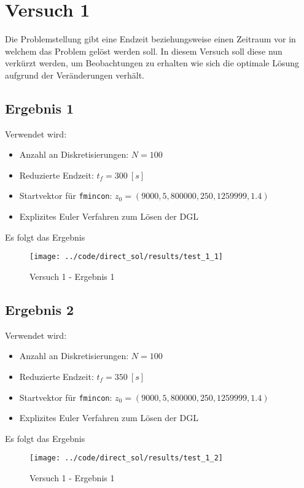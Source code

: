 \newpage
\section{Versuch 1}\label{kap:Versuch1}
Die Problemstellung gibt eine Endzeit beziehungsweise einen Zeitraum vor in welchem das Problem gelöst werden soll. In diesem Versuch soll diese nun verkürzt werden, um Beobachtungen zu erhalten wie sich die optimale Lösung aufgrund der Veränderungen verhält. %

\subsection{Ergebnis 1}
Verwendet wird:
\begin{itemize}
\item Anzahl an Diskretisierungen: $N = 100$ 
\item Reduzierte Endzeit: $t_f = 300 \ [s]$
\item Startvektor für \texttt{fmincon}: $z_0 = (9000,5,800000,250,1259999,1.4)$
\item Explizites Euler Verfahren zum Lösen der DGL
\end{itemize}
Es folgt das Ergebnis
\begin{figure}[H]
\begin{center}
\texttt{[image: ../code/direct\_sol/results/test\_1\_1]}
\caption{Versuch 1 - Ergebnis 1}\label{img:test_1_1}
\end{center}
\end{figure}

\newpage
\subsection{Ergebnis 2}
Verwendet wird:
\begin{itemize}
\item Anzahl an Diskretisierungen: $N = 100$ 
\item Reduzierte Endzeit: $t_f = 350 \ [s]$
\item Startvektor für \texttt{fmincon}: $z_0 = (9000,5,800000,250,1259999,1.4)$
\item Explizites Euler Verfahren zum Lösen der DGL
\end{itemize}
Es folgt das Ergebnis
\begin{figure}[H]
\begin{center}
\texttt{[image: ../code/direct\_sol/results/test\_1\_2]}
\caption{Versuch 1 - Ergebnis 1}\label{img:test_1_2}
\end{center}
\end{figure}

